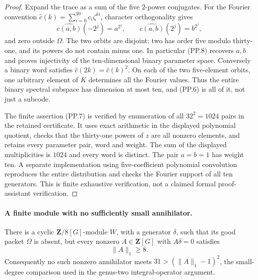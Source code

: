 \begin{proof}
Expand the trace as a sum of the five $2$-power conjugates.
For the Fourier convention
$\widehat c(k)=\sum_{i=0}^{30}c_i\zeta^{ki}$, character
orthogonality gives
\[
 \widehat{c(a,b)}(-2^j)=a^{2^j},\qquad
 \widehat{c(a,b)}(2^j)=b^{2^j},
 \tag{PP.8}
\]
and zero outside $\Omega$. The two orbits are disjoint:
two has order five modulo thirty-one, and its powers do not
contain minus one. In particular (PP.8) recovers $a,b$ and
proves injectivity of the ten-dimensional binary parameter
space. Conversely a binary word satisfies
$\widehat c(2k)=\widehat c(k)^2$.
On each of the two five-element orbits, one arbitrary element
of $K$ determines all the Fourier values. Thus the entire
binary spectral subspace has dimension at most ten, and
(PP.6) is all of it, not just a subcode.

The finite assertion (PP.7) is verified by enumeration of all
$32^2=1024$ pairs in the retained certificate. It uses exact
arithmetic in the displayed polynomial quotient, checks that
the thirty-one powers of $z$ are all nonzero elements, and
retains every parameter pair, word and weight. The sum of
the displayed multiplicities is $1024$ and every word is distinct.
The pair $a=b=1$ has weight ten. A separate implementation
using five-coefficient polynomial convolution reproduces
the entire distribution and checks the Fourier support of
all ten generators. This is finite exhaustive verification,
not a claimed formal proof-assistant verification.
\end{proof}

\paragraph{A finite module with no sufficiently small annihilator.}
There is a cyclic $\mathbf Z/8[G]$-module $W$, with a generator
$\delta$, such that its good packet $\Omega$ is absent, but
every nonzero $A\in\mathbf Z[G]$ with $A\delta=0$ satisfies
\[
                         \|A\|_1\ge8.
 \tag{PP.9}
\]
Consequently no such nonzero annihilator meets
$31>(\|A\|_1-1)^2$, the small-degree comparison used in
the genus-two integral-operator argument.


